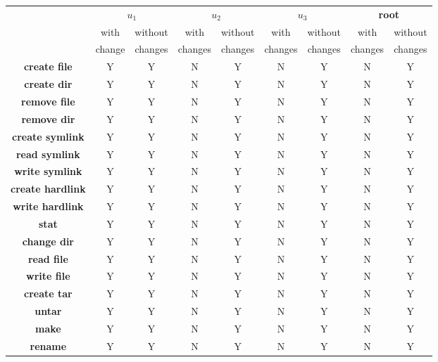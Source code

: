 
\begin{table*}[th]
\small
\centering

\begin{tabular}{ c|c|c|c|c|c|c|c|c| }
  \cline{2-9}
  & 
  \multicolumn{2}{c}{\textbf{$u_{1}$}} &
  \multicolumn{2}{|c}{\textbf{$u_{2}$}} &
  \multicolumn{2}{|c}{\textbf{$u_{3}$}} &
  \multicolumn{2}{|c|}{\textbf{root}}  \\
  \cline{2-9}
  \multicolumn{1}{c|}{} &
  with & without & with & without & with & without & with & without\\
  \multicolumn{1}{c|}{} &
  change & changes & changes & changes & changes & changes & changes &
  changes\\
  \hline
  \multicolumn{1}{|c|}{\textbf{create file}}
  & Y & Y & N & Y & N & Y & N & Y \\
  \hline
  \multicolumn{1}{|c|}{\textbf{create dir}}
  & Y & Y & N & Y & N & Y & N & Y \\
  \hline
  \multicolumn{1}{|c|}{\textbf{remove file}}
  & Y & Y & N & Y & N & Y & N & Y \\
  \hline
  \multicolumn{1}{|c|}{\textbf{remove dir}}
  & Y & Y & N & Y & N & Y & N & Y \\
  \hline
  \multicolumn{1}{|c|}{\textbf{create symlink}}
  & Y & Y & N & Y & N & Y & N & Y \\
  \hline
  \multicolumn{1}{|c|}{\textbf{read symlink}}
  & Y & Y & N & Y & N & Y & N & Y \\
  \hline
  \multicolumn{1}{|c|}{\textbf{write symlink}}
  & Y & Y & N & Y & N & Y & N & Y \\
  \hline
  \multicolumn{1}{|c|}{\textbf{create hardlink}}
  & Y & Y & N & Y & N & Y & N & Y \\
  \hline
  \multicolumn{1}{|c|}{\textbf{write hardlink}}
  & Y & Y & N & Y & N & Y & N & Y \\
  \hline
  \multicolumn{1}{|c|}{\textbf{stat}}
  & Y & Y & N & Y & N & Y & N & Y \\
  \hline
  \multicolumn{1}{|c|}{\textbf{change dir}}
  & Y & Y & N & Y & N & Y & N & Y \\
  \hline
  \multicolumn{1}{|c|}{\textbf{read file}}
  & Y & Y & N & Y & N & Y & N & Y \\
  \hline
  \multicolumn{1}{|c|}{\textbf{write file}}
  & Y & Y & N & Y & N & Y & N & Y \\
  \hline
  \multicolumn{1}{|c|}{\textbf{create tar}}
  & Y & Y & N & Y & N & Y & N & Y \\
  \hline
  \multicolumn{1}{|c|}{\textbf{untar}}
  & Y & Y & N & Y & N & Y & N & Y \\
  \hline
  \multicolumn{1}{|c|}{\textbf{make}}
  & Y & Y & N & Y & N & Y & N & Y \\
  \hline
  \multicolumn{1}{|c|}{\textbf{rename}}
  & Y & Y & N & Y & N & Y & N & Y \\
  \hline
\end{tabular}


\end{table*}
